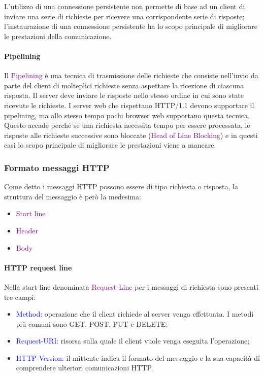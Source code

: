 \newpage

L'utilizzo di una connessione persistente non permette di base ad un client di inviare una serie di richieste per ricevere una corrispondente serie di risposte; l'instaurazione di una connessione persistente ha lo scopo principale di migliorare le prestazioni della comunicazione.
\paragraph{Pipelining}Il \textcolor{purple}{Pipelining} è una tecnica di trasmissione delle richieste che consiste nell’invio da parte del client di molteplici richieste senza
aspettare la ricezione di ciascuna risposta. Il server deve inviare le risposte nello stesso ordine in cui sono state ricevute le richieste.
\newline I server web che rispettano HTTP/1.1 devono supportare il pipelining, ma allo stesso tempo pochi browser web supportano questa tecnica. Questo accade perché se una richiesta necessita tempo per essere processata, le risposte alle richieste successive sono bloccate (\textcolor{purple}{Head of Line Blocking}) e in questi casi lo scopo principale di migliorare le prestazioni viene a mancare.

\subsubsection{Formato messaggi HTTP}
Come detto i messaggi HTTP possono essere di tipo richiesta o risposta, la struttura del messaggio è però la medesima:
\begin{itemize}
    \item \textcolor{purple}{Start line}
    \item \textcolor{purple}{Header}
    \item \textcolor{purple}{Body}
\end{itemize}

\paragraph{HTTP request line} Nella start line denominata \textcolor{purple}{Request-Line} per i messaggi di richiesta sono presenti tre campi:
\begin{itemize}
    \item \textcolor{blue}{Method:} operazione che il client richiede al server venga effettuata. I metodi più comuni sono GET, POST, PUT e DELETE;
    \item \textcolor{blue}{Request-URI:} risorsa sulla quale il client vuole venga eseguita l'operazione;
    \item \textcolor{blue}{HTTP-Version:} il mittente indica il formato del messaggio e la sua capacità di comprendere ulteriori comunicazioni HTTP. 
\end{itemize}

